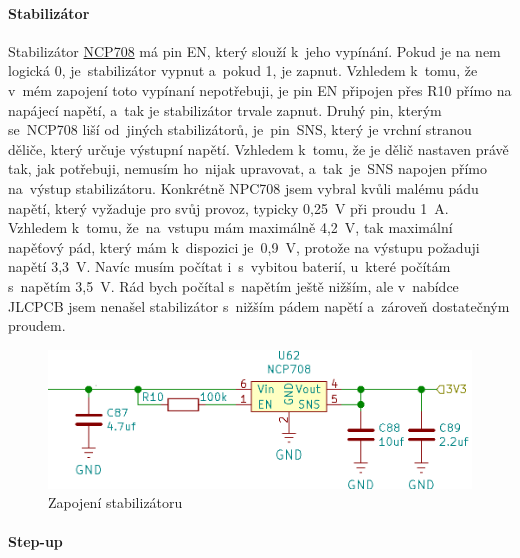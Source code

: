 \paragraph*{Stabilizátor}

Stabilizátor \href{https://datasheet.lcsc.com/szlcsc/ON-Semicon-ON-NCP708MU330TAG_C183178.pdf}{NCP708} má pin EN, který slouží k~jeho vypínání. 
Pokud je na nem logická 0, je~stabilizátor vypnut a~pokud 1, je zapnut. Vzhledem k~tomu, že v~mém zapojení toto vypínaní nepotřebuji, je pin EN připojen 
přes R10 přímo na napájecí napětí, a~tak je stabilizátor trvale zapnut. Druhý pin, kterým se~NCP708 liší od~jiných stabilizátorů, je~pin~SNS, 
který je vrchní stranou děliče, který určuje výstupní napětí. Vzhledem k~tomu, že je dělič nastaven právě tak, jak potřebuji, nemusím ho~nijak 
upravovat, a~tak~je~SNS napojen přímo na~výstup stabilizátoru. %
Konkrétně NPC708 jsem vybral kvůli malému pádu napětí, který vyžaduje pro svůj provoz, typicky 0,25~V při proudu 1~A. Vzhledem k~tomu, že~na~vstupu 
mám maximálně 4,2~V, tak maximální napěťový pád, který mám k~dispozici je~0,9~V, protože na výstupu požaduji napětí 3,3~V. Navíc musím počítat 
i~s~vybitou baterií, u~které počítám s~napětím 3,5~V. Rád bych počítal s~napětím ještě nižším, ale v~nabídce JLCPCB jsem nenašel stabilizátor 
s~nižším pádem napětí a~zároveň dostatečným proudem. 

\begin{figure}[htbp]
    \centering
    \includegraphics[width=400pt]{kapitoly/obrazky/E4/napajeni/stabilizator.png}
    \caption{Zapojení stabilizátoru}
    \label{fig:E4-stabilizator}
\end{figure}

\paragraph*{Step-up}

